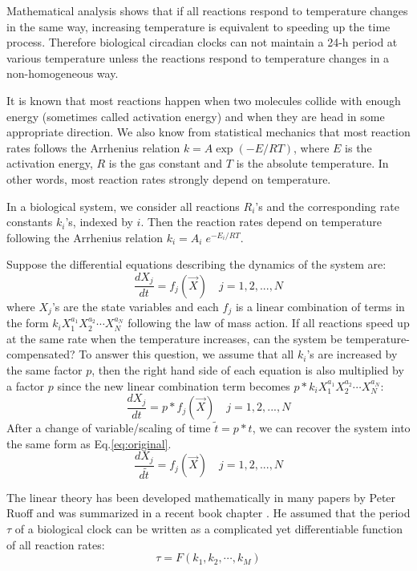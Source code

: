 \documentclass[a4paper,10pt]{article}
\numberwithin{equation}{section}
\begin{document}
Mathematical analysis shows that if all reactions respond to temperature changes in the same way, increasing temperature is equivalent to speeding up the time process. Therefore biological circadian clocks can not maintain a 24-h period at various temperature unless the reactions respond to temperature changes in a non-homogeneous way.


It is known that most reactions happen when two molecules collide with enough energy (sometimes called activation energy) and when they are head in some appropriate direction. We also know from statistical mechanics that most reaction rates follows the Arrhenius relation $k=A\exp(-E/RT)$, where $E$ is the activation energy, $R$ is the gas constant and $T$ is the absolute temperature. In other words, most reaction rates strongly depend on temperature.

In a biological system, we consider all reactions $R_i$'s and the corresponding rate constants $k_i$'s, indexed by $i$. Then the reaction rates depend on temperature following the Arrhenius relation $k_i=A_i\; e^{-E_i/RT}$.

Suppose the differential equations describing the dynamics of the system are: 
\begin{equation}\label{eq:original}
\frac{d X_j}{dt} = f_j(\overrightarrow{X})  \quad j=1,2,...,N
\end{equation} 
where $X_j$'s are the state variables and each $f_j$ is a linear combination of terms in the form $k_iX_1^{a_1}X_2^{a_2}\cdots X_N^{a_N}$ following the law of mass action. 
If all reactions speed up at the same rate when the temperature increases, can the system be temperature-compensated? To answer this question, we assume that all $k_i$'s are increased by the same factor $p$, then the right hand side of each equation is also multiplied by a factor $p$ since the new linear combination term becomes $p*k_iX_1^{a_1}X_2^{a_2}\cdots X_N^{a_N}$:
\[
\frac{d X_j}{dt} = p*f_j(\overrightarrow{X})  \quad j=1,2,...,N 
\]
After a change of variable/scaling of time $\tilde{t}=p*t$, we can recover the system into the same form as Eq.\ref{eq:original}.
\begin{equation}
 \frac{d X_j}{d\tilde{t}} = f_j(\overrightarrow{X})  \quad j=1,2,...,N 
\end{equation}

The linear theory has been developed mathematically in many papers by Peter Ruoff and was summarized in a recent book chapter \citet{ruoff2004}. He assumed that the period $\tau$  of a biological clock can be written as a complicated yet differentiable function of all reaction rates:
\begin{equation}
\tau=F(k_1,k_2,\cdots ,k_M)
\end{equation}
\end{document}
